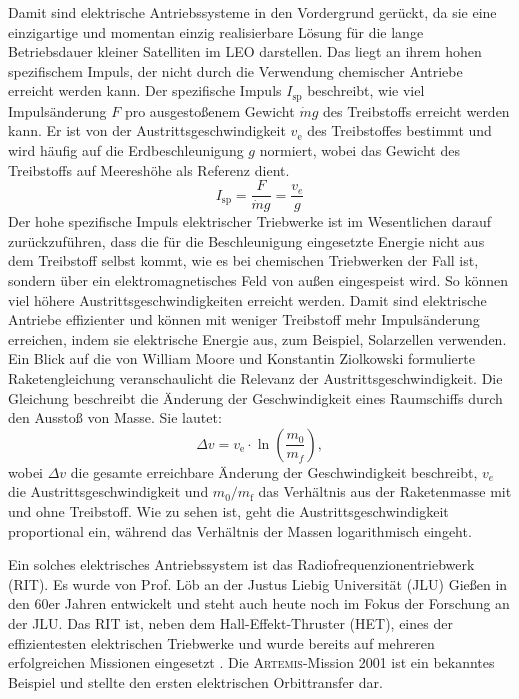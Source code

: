 Damit sind elektrische Antriebssysteme in den Vordergrund gerückt, da sie eine einzigartige und momentan einzig realisierbare Lösung für die lange Betriebsdauer kleiner Satelliten im LEO darstellen. Das liegt an ihrem hohen spezifischem Impuls, der nicht durch die Verwendung chemischer Antriebe erreicht werden kann. Der spezifische Impuls $I_{\text{sp}}$ beschreibt, wie viel Impulsänderung $F$ pro ausgestoßenem Gewicht $\dot mg$ des Treibstoffs erreicht werden kann. Er ist von der Austrittsgeschwindigkeit $v_\text{e}$ des Treibstoffes bestimmt und wird häufig auf die Erdbeschleunigung $g$ normiert, wobei das Gewicht des Treibstoffs auf Meereshöhe als Referenz dient.
\begin{equation}
    I_{\text{sp}} = \frac{F}{\dot{m}g} = \frac{v_e}{g}
\end{equation} 
Der hohe spezifische Impuls elektrischer Triebwerke ist im Wesentlichen darauf zurückzuführen, dass die für die Beschleunigung eingesetzte Energie nicht aus dem Treibstoff selbst kommt, wie es bei chemischen Triebwerken der Fall ist, sondern über ein elektromagnetisches Feld von außen eingespeist wird. So können viel höhere Austrittsgeschwindigkeiten erreicht werden. Damit sind elektrische Antriebe effizienter und können mit weniger Treibstoff mehr Impulsänderung erreichen, indem sie elektrische Energie aus, zum Beispiel, Solarzellen verwenden. Ein Blick auf die von William Moore und Konstantin Ziolkowski formulierte Raketengleichung veranschaulicht die Relevanz der Austrittsgeschwindigkeit. Die Gleichung beschreibt die Änderung der Geschwindigkeit eines Raumschiffs durch den Ausstoß von Masse. Sie lautet:
\begin{equation}
    \Delta v = v_{\text{e}} \cdot \ln\left(\frac{m_0}{m_f}\right),
\end{equation}
wobei $\Delta v$ die gesamte erreichbare Änderung der Geschwindigkeit beschreibt, $v_e$ die Austrittsgeschwindigkeit und $m_{\text{0}} / m_{\text{f}}$ das Verhältnis aus der Raketenmasse mit und ohne Treibstoff. Wie zu sehen ist, geht die Austrittsgeschwindigkeit proportional ein, während das Verhältnis der Massen logarithmisch eingeht. 

Ein solches elektrisches Antriebssystem ist das Radiofrequenzionentriebwerk (RIT). Es wurde von Prof. Löb an der Justus Liebig Universität (JLU) Gießen in den 60er Jahren entwickelt und steht auch heute noch im Fokus der Forschung an der JLU. Das RIT ist, neben dem Hall-Effekt-Thruster (HET), eines der effizientesten elektrischen Triebwerke und wurde bereits auf mehreren erfolgreichen Missionen eingesetzt \cite[S. 6]{ion}. Die \textsc{Artemis}-Mission 2001 ist ein bekanntes Beispiel und stellte den ersten elektrischen Orbittransfer dar.

